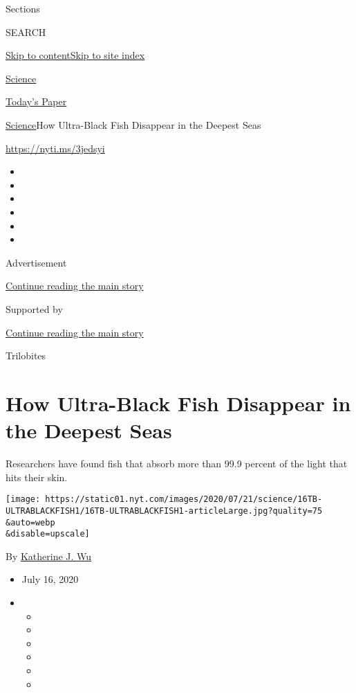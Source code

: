 Sections

SEARCH

\protect\hyperlink{site-content}{Skip to
content}\protect\hyperlink{site-index}{Skip to site index}

\href{https://www.nytimes.com/section/science}{Science}

\href{https://myaccount.nytimes.com/auth/login?response_type=cookie\&client_id=vi}{}

\href{https://www.nytimes.com/section/todayspaper}{Today's Paper}

\href{/section/science}{Science}\textbar{}How Ultra-Black Fish Disappear
in the Deepest Seas

\url{https://nyti.ms/3jedsyi}

\begin{itemize}
\item
\item
\item
\item
\item
\item
\end{itemize}

Advertisement

\protect\hyperlink{after-top}{Continue reading the main story}

Supported by

\protect\hyperlink{after-sponsor}{Continue reading the main story}

Trilobites

\hypertarget{how-ultra-black-fish-disappear-in-the-deepest-seas}{%
\section{How Ultra-Black Fish Disappear in the Deepest
Seas}\label{how-ultra-black-fish-disappear-in-the-deepest-seas}}

Researchers have found fish that absorb more than 99.9 percent of the
light that hits their skin.

\texttt{[image: https://static01.nyt.com/images/2020/07/21/science/16TB-ULTRABLACKFISH1/16TB-ULTRABLACKFISH1-articleLarge.jpg?quality=75\\\&auto=webp\\\&disable=upscale]}

By \href{https://www.nytimes.com/by/katherine-j--wu}{Katherine J. Wu}

\begin{itemize}
\item
  July 16, 2020
\item
  \begin{itemize}
  \item
  \item
  \item
  \item
  \item
  \item
  \end{itemize}
\end{itemize}

